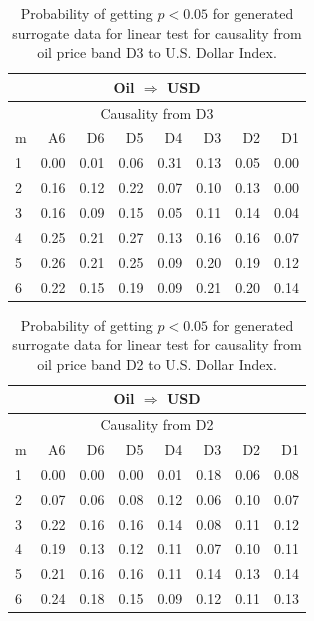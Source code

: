 %
%
\begin{table}[H]
\begin{center}
\begin{tabular}{l|r r r r r r r}
\hline\hline
\multicolumn{8}{c}{Oil $\Rightarrow$ USD}\\
\hline
\multicolumn{8}{c}{Causality from D3}\\
\hline\hline
m & A6 & D6 & D5 & D4 & D3 & D2 & D1 \\
\hline
1 & 0.00 & 0.01 & 0.06 & 0.31 & 0.13 & 0.05 & 0.00 \\
2 & 0.16 & 0.12 & 0.22 & 0.07 & 0.10 & 0.13 & 0.00 \\
3 & 0.16 & 0.09 & 0.15 & 0.05 & 0.11 & 0.14 & 0.04 \\
4 & 0.25 & 0.21 & 0.27 & 0.13 & 0.16 & 0.16 & 0.07 \\
5 & 0.26 & 0.21 & 0.25 & 0.09 & 0.20 & 0.19 & 0.12 \\
6 & 0.22 & 0.15 & 0.19 & 0.09 & 0.21 & 0.20 & 0.14 \\
\hline\hline
\end{tabular}
\caption{Probability of getting $p < 0.05$ for generated surrogate data for linear test for causality from oil price band D3 to U.S. Dollar Index.}
\end{center}
\end{table}

%
%
\begin{table}[H]
\begin{center}
\begin{tabular}{l|r r r r r r r}
\hline\hline
\multicolumn{8}{c}{Oil $\Rightarrow$ USD}\\
\hline
\multicolumn{8}{c}{Causality from D2}\\
\hline\hline
m & A6 & D6 & D5 & D4 & D3 & D2 & D1 \\
\hline
1 & 0.00 & 0.00 & 0.00 & 0.01 & 0.18 & 0.06 & 0.08 \\
2 & 0.07 & 0.06 & 0.08 & 0.12 & 0.06 & 0.10 & 0.07 \\
3 & 0.22 & 0.16 & 0.16 & 0.14 & 0.08 & 0.11 & 0.12 \\
4 & 0.19 & 0.13 & 0.12 & 0.11 & 0.07 & 0.10 & 0.11 \\
5 & 0.21 & 0.16 & 0.16 & 0.11 & 0.14 & 0.13 & 0.14 \\
6 & 0.24 & 0.18 & 0.15 & 0.09 & 0.12 & 0.11 & 0.13 \\
\hline\hline
\end{tabular}
\caption{Probability of getting $p < 0.05$ for generated surrogate data for linear test for causality from oil price band D2 to U.S. Dollar Index.}
\end{center}
\end{table}

